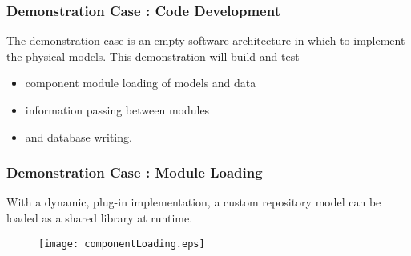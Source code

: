 
\begin{frame}[ctb!]
  \frametitle{Demonstration Case : Code Development}
  The demonstration case is an empty software architecture in which to implement 
  the physical models. This demonstration will build and test
  \begin{itemize}
    \item component module loading of models and data
    \item information passing between modules
    \item and database writing.
  \end{itemize}
\end{frame}

\begin{frame}[ctb!]
  \frametitle{Demonstration Case : Module Loading}
  With a dynamic, plug-in implementation,  a custom
  repository model can be loaded as a shared library at runtime. 

  \begin{figure}[htbp!]
    \begin{center}
      \texttt{[image: componentLoading.eps]}
    \end{center}
  \end{figure}

\end{frame}

